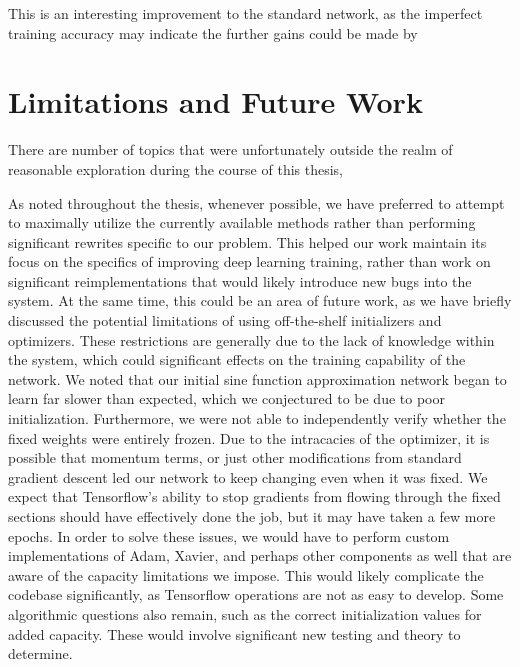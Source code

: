 This is an interesting improvement to the standard network, as the imperfect training accuracy may indicate the further gains could be made by 


\section{Limitations and Future Work}
There are number of topics that were unfortunately outside the realm of reasonable exploration during the course of this thesis,

As noted throughout the thesis, whenever possible, we have preferred to attempt to maximally utilize the currently available methods rather than performing significant rewrites specific to our problem.
This helped our work maintain its focus on the specifics of improving deep learning training, rather than work on significant reimplementations that would likely introduce new bugs into the system.
At the same time, this could be an area of future work, as we have briefly discussed the potential limitations of using off-the-shelf initializers and optimizers.
These restrictions are generally due to the lack of knowledge within the system, which could significant effects on the training capability of the network.
We noted that our initial sine function approximation network began to learn far slower than expected, which we conjectured to be due to poor initialization.
Furthermore, we were not able to independently verify whether the fixed weights were entirely frozen.
Due to the intracacies of the optimizer, it is possible that momentum terms, or just other modifications from standard gradient descent led our network to keep changing even when it was fixed.
We expect that Tensorflow's ability to stop gradients from flowing through the fixed sections should have effectively done the job, but it may have taken a few more epochs.
In order to solve these issues, we would have to perform custom implementations of Adam, Xavier, and perhaps other components as well that are aware of the capacity limitations we impose.
This would likely complicate the codebase significantly, as Tensorflow operations are not as easy to develop.
Some algorithmic questions also remain, such as the correct initialization values for added capacity.
These would involve significant new testing and theory to determine.

